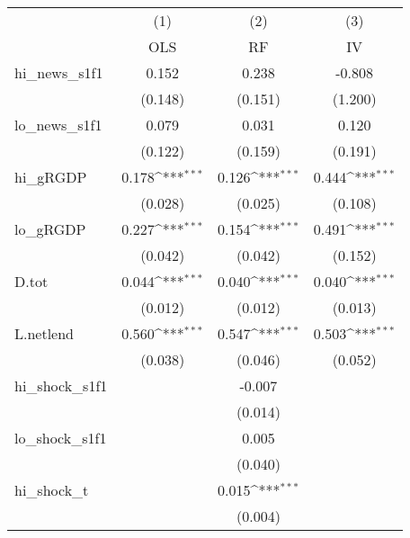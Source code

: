 {
\def\sym#1{\ifmmode^{#1}\else\(^{#1}\)\fi}
\begin{tabular}{l*{3}{c}}
\toprule
            &\multicolumn{1}{c}{(1)}&\multicolumn{1}{c}{(2)}&\multicolumn{1}{c}{(3)}\\
            &\multicolumn{1}{c}{OLS}&\multicolumn{1}{c}{RF}&\multicolumn{1}{c}{IV}\\
\midrule
hi\_news\_s1f1&       0.152         &       0.238         &      -0.808         \\
            &     (0.148)         &     (0.151)         &     (1.200)         \\
\addlinespace
lo\_news\_s1f1&       0.079         &       0.031         &       0.120         \\
            &     (0.122)         &     (0.159)         &     (0.191)         \\
\addlinespace
hi\_gRGDP    &       0.178\sym{***}&       0.126\sym{***}&       0.444\sym{***}\\
            &     (0.028)         &     (0.025)         &     (0.108)         \\
\addlinespace
lo\_gRGDP    &       0.227\sym{***}&       0.154\sym{***}&       0.491\sym{***}\\
            &     (0.042)         &     (0.042)         &     (0.152)         \\
\addlinespace
D.tot       &       0.044\sym{***}&       0.040\sym{***}&       0.040\sym{***}\\
            &     (0.012)         &     (0.012)         &     (0.013)         \\
\addlinespace
L.netlend   &       0.560\sym{***}&       0.547\sym{***}&       0.503\sym{***}\\
            &     (0.038)         &     (0.046)         &     (0.052)         \\
\addlinespace
hi\_shock\_s1f1&                     &      -0.007         &                     \\
            &                     &     (0.014)         &                     \\
\addlinespace
lo\_shock\_s1f1&                     &       0.005         &                     \\
            &                     &     (0.040)         &                     \\
\addlinespace
hi\_shock\_t  &                     &       0.015\sym{***}&                     \\
            &                     &     (0.004)         &                     \\

\end{tabular}}
